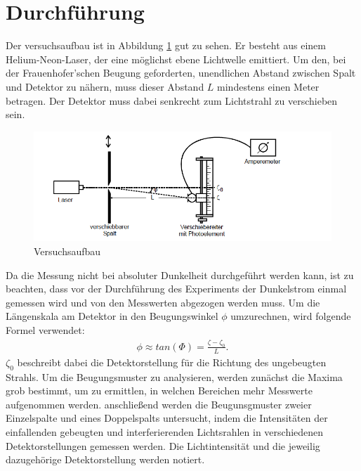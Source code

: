 \section{Durchführung}
Der versuchsaufbau ist in Abbildung \ref{abb5} gut zu sehen. Er besteht aus einem Helium-Neon-Laser,
der eine möglichst ebene Lichtwelle emittiert. Um den, bei der Frauenhofer'schen Beugung geforderten,
unendlichen Abstand zwischen Spalt und Detektor zu nähern, muss dieser Abstand $L$ mindestens einen Meter
betragen. Der Detektor muss dabei senkrecht zum Lichtstrahl zu verschieben sein.
\begin{figure}
  \centering
  \includegraphics[scale=0.7]{aufbau.PNG}
  \caption{Versuchsaufbau \cite{Q1}}
  \label{abb5}
\end{figure}
Da die Messung nicht bei absoluter Dunkelheit durchgeführt werden kann, ist zu beachten,
dass vor der Durchführung des Experiments der Dunkelstrom einmal gemessen wird und von
den Messwerten abgezogen werden muss.
Um die Längenskala am Detektor in den Beugungswinkel $\phi$ umzurechnen, wird folgende
Formel verwendet:
\begin{align*}
  \phi \approx tan(\Phi) = \frac{\zeta - \zeta_0}{L}.
\end{align*}
$\zeta_0$ beschreibt dabei die Detektorstellung für die Richtung des ungebeugten Strahls.
Um die Beugungsmuster zu analysieren, werden zunächst die Maxima grob bestimmt, um zu
ermittlen, in welchen Bereichen mehr Messwerte aufgenommen werden. anschließend werden
die Beugunsgmuster zweier Einzelspalte und eines Doppelspalts untersucht, indem die
Intensitäten der einfallenden gebeugten und interferierenden Lichtsrahlen in verschiedenen
Detektorstellungen gemessen werden. Die Lichtintensität und die jeweilig dazugehörige
Detektorstellung werden notiert.
